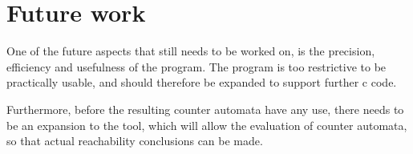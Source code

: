\documentclass[12pt]{article}
\begin{document}
\section{Future work}
One of the future aspects that still needs to be worked on, is the precision, efficiency and usefulness of the program. The program is too restrictive to be practically usable, and should therefore be expanded to support further c code.

Furthermore, before the resulting counter automata have any use, there needs to be an expansion to the tool, which will allow the evaluation of counter automata, so that actual reachability conclusions can be made.
\printbibliography
\end{document}
